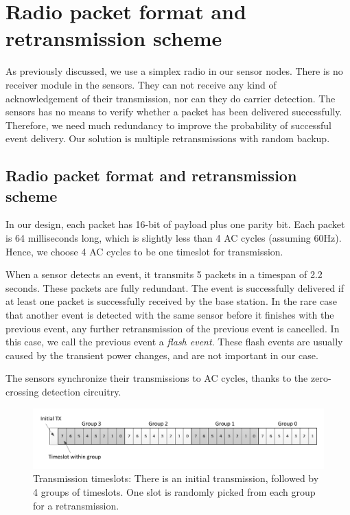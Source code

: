 \chapter{Radio packet format and retransmission scheme}\label{chap4}

As previously discussed, we use a simplex radio in our sensor nodes. There is no receiver module in the sensors. They can not receive any kind of acknowledgement of their transmission, nor can they do carrier detection. The sensors has no means to verify whether a packet has been delivered successfully. Therefore, we need much redundancy to improve the probability of successful event delivery. Our solution is multiple retransmissions with random backup.  

\section{Radio packet format and retransmission scheme}

In our design, each packet has 16-bit of payload plus one parity bit. Each packet is 64 milliseconds long, which is slightly less than 4 AC cycles (assuming 60Hz). Hence, we choose 4 AC cycles to be one timeslot for transmission. 

When a sensor detects an event, it transmits 5 packets in a timespan of 2.2 seconds. These packets are fully redundant. The event is successfully delivered if at least one packet is successfully received by the base station. In the rare case that another event is detected with the same sensor before it finishes with the previous event, any further retransmission of the previous event is cancelled. In this case, we call the previous event a \textit{flash event}. These flash events are usually caused by the transient power changes, and are not important in our case. 

The sensors synchronize their transmissions to AC cycles, thanks to the zero-crossing detection circuitry. 

\begin{figure}[htb]
  \centering
  \includegraphics[width=\textwidth]{figures/slots}
  \caption[Transmission timeslots]{Transmission timeslots: There is an initial transmission, followed by 4 groups of timeslots. One slot is randomly picked from each group for a retransmission. }
  \label{fig:slots}
\end{figure}

